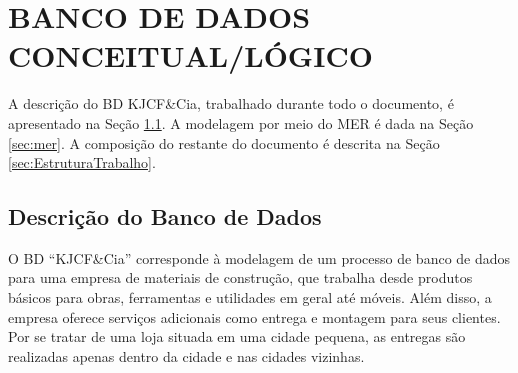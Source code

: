 \documentclass[
12pt,
a4paper,
semrecuonosumario,
sumario = abnt-6027-2012]{report}
\begin{document}
\chapter{BANCO DE DADOS CONCEITUAL/LÓGICO}

	A descrição do BD KJCF\&Cia, trabalhado durante todo o documento, é apresentado na Seção \ref{sec:DescricaoBD}. A modelagem por meio do MER é dada na Seção \ref{sec:mer}. A composição do restante do documento é descrita na Seção \ref{sec:EstruturaTrabalho}.

    \section{Descrição do Banco de Dados}\label{sec:DescricaoBD}
	O BD “KJCF\&Cia” corresponde à modelagem de um processo de banco de dados para uma empresa de materiais de construção, que trabalha desde produtos básicos para obras, ferramentas e utilidades em geral até móveis. Além disso, a empresa oferece serviços adicionais como entrega e montagem para seus clientes. Por se tratar de uma loja situada em uma cidade pequena, as entregas são realizadas apenas dentro da cidade e nas cidades vizinhas.
\end{document}
